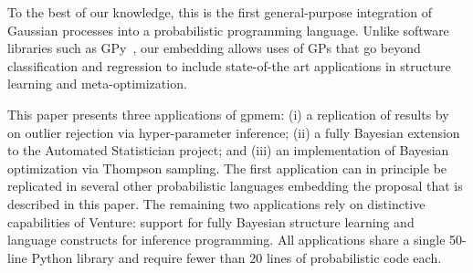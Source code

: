 To the best of our knowledge, this is the first general-purpose integration of
Gaussian processes into a probabilistic programming language. Unlike software
libraries such as GPy~\citep{gpy2014}, our embedding allows uses of GPs that go beyond classification and regression to include state-of-the art applications in structure learning and meta-optimization.

This paper presents three applications of gpmem: (i) a replication of results by~\citet{neal1997monte} on outlier rejection via hyper-parameter inference; (ii) a fully Bayesian extension to the Automated Statistician project; and (iii) an implementation of Bayesian optimization via Thompson sampling. The first application can in principle be replicated in several other probabilistic languages embedding the proposal that is described in this paper. The remaining two applications rely on distinctive capabilities of Venture: support for fully Bayesian structure learning and language constructs for inference programming. All applications share a single 50-line Python library and require fewer than 20 lines of probabilistic code each.



